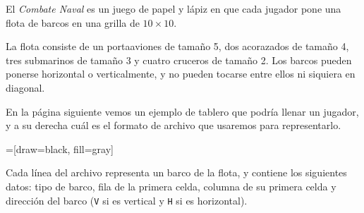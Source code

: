 
% 

\lstset{language=file,frame=single}

El \emph{Combate Naval} es un juego de papel y lápiz
en que cada jugador pone una flota de barcos
en una grilla de \(10\times 10\).

La flota consiste de
un portaaviones de tamaño 5,
dos acorazados de tamaño 4,
tres submarinos de tamaño 3
y cuatro cruceros de tamaño 2.
Los barcos pueden ponerse horizontal o verticalmente,
y no pueden tocarse entre ellos ni siquiera en dia\-gonal.

En la página siguiente vemos un ejemplo de tablero que podría llenar un jugador,
y a su derecha cuál es el formato de archivo que usaremos para representarlo.

\newpage

=[draw=black, fill=gray]
\begin{minipage}[T]{0.5\textwidth}
\end{minipage}
\begin{minipage}[T]{0.45\textwidth}
  \vspace{3ex}
  
\end{minipage}

Cada línea del archivo representa un barco de la flota,
y contiene los siguientes datos:
tipo de barco,
fila de la primera celda,
columna de su primera celda
y dirección del barco (\verb+V+ si es vertical y \verb+H+ si es horizontal).

